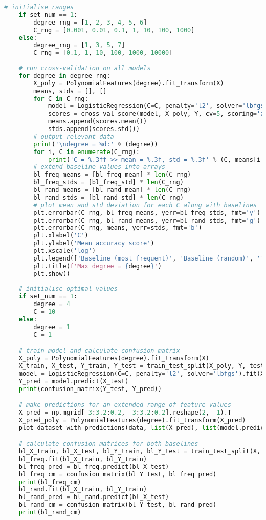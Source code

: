 \documentclass[12pt]{article}
\begin{document}
\begin{lstlisting}[language=Python]
    # initialise ranges
    if set_num == 1:
        degree_rng = [1, 2, 3, 4, 5, 6]
        C_rng = [0.001, 0.01, 0.1, 1, 10, 100, 1000]
    else:
        degree_rng = [1, 3, 5, 7]
        C_rng = [0.1, 1, 10, 100, 1000, 10000]
    
    # run cross-validation on all models
    for degree in degree_rng:
        X_poly = PolynomialFeatures(degree).fit_transform(X)
        means, stds = [], []
        for C in C_rng:
            model = LogisticRegression(C=C, penalty='l2', solver='lbfgs').fit(X_poly, Y)
            scores = cross_val_score(model, X_poly, Y, cv=5, scoring='accuracy')
            means.append(scores.mean())
            stds.append(scores.std())
        # output relevant data
        print('\ndegree = %d:' % (degree))
        for i, C in enumerate(C_rng):
            print('C = %.3ff >> mean = %.3f, std = %.3f' % (C, means[i], stds[i]))
        # extend baseline values into arrays
        bl_freq_means = [bl_freq_mean] * len(C_rng)
        bl_freq_stds = [bl_freq_std] * len(C_rng)
        bl_rand_means = [bl_rand_mean] * len(C_rng)
        bl_rand_stds = [bl_rand_std] * len(C_rng)
        # plot mean and std deviation for each C along with baselines
        plt.errorbar(C_rng, bl_freq_means, yerr=bl_freq_stds, fmt='y')
        plt.errorbar(C_rng, bl_rand_means, yerr=bl_rand_stds, fmt='g')
        plt.errorbar(C_rng, means, yerr=stds, fmt='b')
        plt.xlabel('C')
        plt.ylabel('Mean accuracy score')
        plt.xscale('log')
        plt.legend(['Baseline (most frequent)', 'Baseline (random)', 'Trained model'])
        plt.title(f'Max degree = {degree}')
        plt.show()
    
    # initialise optimal values
    if set_num == 1:
        degree = 4
        C = 10
    else:
        degree = 1
        C = 1

    # train model and calculate confusion matrix
    X_poly = PolynomialFeatures(degree).fit_transform(X)
    X_train, X_test, Y_train, Y_test = train_test_split(X_poly, Y, test_size=0.2)
    model = LogisticRegression(C=C, penalty='l2', solver='lbfgs').fit(X_train, Y_train)
    Y_pred = model.predict(X_test)
    print(confusion_matrix(Y_test, Y_pred))

    # make predictions for an extended range of feature values
    X_pred = np.mgrid[-3:3.2:0.2, -3:3.2:0.2].reshape(2, -1).T
    X_pred_poly = PolynomialFeatures(degree).fit_transform(X_pred)
    plot_dataset_with_predictions(data, list(X_pred), list(model.predict(X_pred_poly)))

    # calculate confusion matrices for both baselines
    bl_X_train, bl_X_test, bl_Y_train, bl_Y_test = train_test_split(X, Y, test_size=0.2)
    bl_freq.fit(bl_X_train, bl_Y_train)
    bl_freq_pred = bl_freq.predict(bl_X_test)
    bl_freq_cm = confusion_matrix(bl_Y_test, bl_freq_pred)
    print(bl_freq_cm)
    bl_rand.fit(bl_X_train, bl_Y_train)
    bl_rand_pred = bl_rand.predict(bl_X_test)
    bl_rand_cm = confusion_matrix(bl_Y_test, bl_rand_pred)
    print(bl_rand_cm)


\end{lstlisting}
\end{document}
